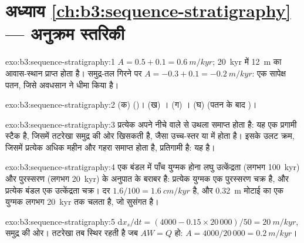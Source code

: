 \section*{अध्याय \ref{ch:b3:sequence-stratigraphy} --- अनुक्रम स्तरिकी}

\begin{solution}{exo:b3:sequence-stratigraphy:1}
$A = 0.5 + 0.1 = \qty{0.6}{m/kyr}$; \qty{20}{kyr} में \qty{12}{m} का
आवास-स्थान प्राप्त होता है। समुद्र-तल गिरने पर $A = -0.3 + 0.1 = \qty{-0.2}{m/kyr}$: एक
सापेक्ष पतन, जिसे अवधसान ने धीमा किया है।
\end{solution}

\begin{solution}{exo:b3:sequence-stratigraphy:2}
(क)  ()। (ख) । (ग)
। (घ)  (पतन के बाद )।
\end{solution}

\begin{solution}{exo:b3:sequence-stratigraphy:3}
प्रत्येक  अपने नीचे वाले से उथला समाप्त होता है: यह एक प्रगामी स्टैक है,
जिसमें तटरेखा समुद्र की ओर खिसकती है, जैसा उच्च-स्तर या  में होता है। इसके
उलट क्रम, जिसमें प्रत्येक  अधिक महीन और गहरा समाप्त होता है, प्रतिगामी है:
यह  है।
\end{solution}

\begin{solution}{exo:b3:sequence-stratigraphy:4}
एक बंडल में पाँच युग्मक होना लघु उत्केंद्रता (लगभग
\qty{100}{kyr}) और पुरस्सरण (लगभग \qty{20}{kyr}) के अनुपात के बराबर है: प्रत्येक
युग्मक एक पुरस्सरण चक्र है, और प्रत्येक बंडल एक उत्केंद्रता चक्र। दर
$1.6/100 = \qty{1.6}{cm/kyr}$ है, और \qty{0.32}{m} मोटाई का एक युग्मक लगभग
\qty{20}{kyr} तक चलता है, जो सुसंगत है।
\end{solution}

\begin{solution}{exo:b3:sequence-stratigraphy:5}
$\mathrm dx_s/\mathrm dt = (4000 - 0.15\times20\,000)/50 = \qty{20}{m/kyr}$,
समुद्र की ओर। तटरेखा तब स्थिर रहती है जब $AW = Q$ हो: $A = 4000/20\,000 =
\qty{0.2}{m/kyr}$।
\end{solution}

